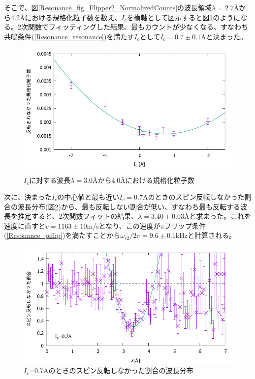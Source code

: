 そこで、図\ref{Resonance_fig_Flipper2_NormalizedCounts}の波長領域$\lambda=$2.7{\AA}から4.2{\AA}における規格化粒子数を数え、$I_c$を横軸として図示すると図\ref{Resonance_fig_Flipper2_Cur}のようになる。2次関数でフィッティングした結果、最もカウントが少なくなる、すなわち共鳴条件(\ref{Resonance_resonance})を満たす$I_c$として$I_c=0.7\pm0.1$Aと決まった。
\begin{figure}[h]
\centering
\includegraphics[width=12cm]{resonance/analysis/Flipper2_Cur_30-40.pdf}
\caption{$I_c$に対する波長$\lambda=$3.0{\AA}から4.0{\AA}における規格化粒子数}\label{Resonance_fig_Flipper2_Cur}
\end{figure}

次に、決まった$I_c$の中心値と最も近い$I_c=0.7$Aのときのスピン反転しなかった割合の波長分布(図\ref{Resonance_fig_Flipper2_CountsRate_7fit})から、最も反転しない割合が低い、すなわち最も反転する波長を推定すると、2次関数フィットの結果、$\lambda=3.40\pm0.03${\AA}と求まった。これを速度に直すと$v=1163\pm10$m/sとなり、この速度が$\pi$フリップ条件(\ref{Resonance_piflip})を満たすことから$\omega_{r2}/2\pi=9.6\pm0.1$kHzと計算される。
\begin{figure}[h]
\centering
\includegraphics[width=12cm]{resonance/analysis/Flipper2_CountsRate_7A_fit.pdf}
\caption{$I_c$=0.7Aのときのスピン反転しなかった割合の波長分布}\label{Resonance_fig_Flipper2_CountsRate_7fit}
\end{figure}

